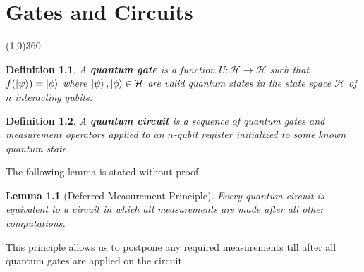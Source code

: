 \documentclass[12pt,twoside,fleqn]{report}
\theoremstyle{thmstyle}
\newtheorem{defn}{Definition}[chapter]
\newtheorem{lemma}{Lemma}[chapter]
\begin{document}
\chapter{Gates and Circuits}
\line(1,0){360} \\

\begin{comment}
     x Definitition of quantum gates
     x reversible defn
     x quantum circuit definition
     x deferred measurement principle
     x Representation of a quantum gate in dirac notation
     x gate which takes \ket\psi to \ket\phi
     x ket bra notation and how it describes a transformation
     x any reversible classical gate has a valid quantum analog
     * Single Qubit Gates
     * Eigen values and Eigenvectors of Hadamard Gate
     * Multiple Qubit Gates
     * Quantum Gates applied to one qubit in an $n$-qubit register
\end{comment}


\begin{defn}
    A \textbf{quantum gate} is a function $U: \mathcal{H} \to \mathcal{H}$ such that $f(\ket\psi) = \ket\phi$ where $\ket\psi, \ket\phi \in \mathcal{H}$ are valid quantum states in the state space $\mathcal{H}$ of $n$ interacting qubits.
\end{defn}

\begin{defn}
    A \textbf{quantum circuit} is a sequence of quantum gates and measurement operators applied to an $n$-qubit register initialized to some known quantum state.
\end{defn}

The following lemma is stated without proof. 

\begin{lemma}[Deferred Measurement Principle]
    Every quantum circuit is equivalent to a circuit in which all measurements are made after all other computations.
\end{lemma}

This principle allows us to postpone any required measurements till after all quantum gates are applied on the circuit.
\end{document}

